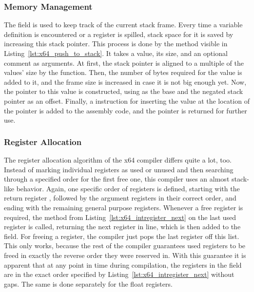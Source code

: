 \subsubsection{Memory Management}

The  field is used to keep track of the current stack frame.
Every time a variable definition is encountered or a register is spilled, stack space for it is saved by increasing this stack pointer.
This process is done by the  method visible in Listing~\ref{lst:x64_push_to_stack}.
It takes a value, its size, and an optional comment as arguments.
At first, the stack pointer is aligned to a multiple of the values' size by the  function.
Then, the number of bytes required for the value is added to it, and the frame size is increased in case it is not big enough yet.
Now, the pointer to this value is constructed, using  as the base and the negated stack pointer as an offset.
Finally, a  instruction for inserting the value at the location of the pointer is added to the assembly code, and the pointer is returned for further use.


\subsubsection{Register Allocation}


The register allocation algorithm of the x64 compiler differs quite a lot, too.
Instead of marking individual registers as used or unused and then searching through a specified order for the first free one, this compiler uses an almost stack-like behavior.
Again, one specific order of registers is defined, starting with the return register , followed by the argument registers in their correct order, and ending with the remaining general purpose registers.
Whenever a free register is required, the  method from Listing~\ref{lst:x64_intregister_next} on the last used register is called, returning the next register in line, which is then added to the  field.
For freeing a register, the compiler just pops the last register off this list.
This only works, because the rest of the compiler guarantees used registers to be freed in exactly the reverse order they were reserved in.
With this guarantee it is apparent that at any point in time during compilation, the registers in the  field are in the exact order specified by Listing~\ref{lst:x64_intregister_next} without gaps.
The same is done separately for the float registers.

